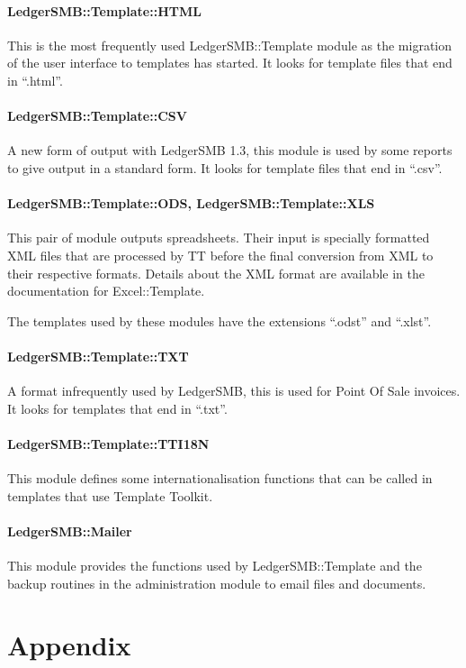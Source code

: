 \documentclass[english]{article}
\newcommand{\lsmb}{LedgerSMB }
\newcommand{\lsmbn}{LedgerSMB}
\newcommand{\lsmbt}{LedgerSMB::Template}
\begin{document}
\subsection{\lsmbt::HTML}
This is the most frequently used \lsmbt{ }module as the migration of the user
interface to templates has started.  It looks for template files that end in
``.html''.

\subsection{\lsmbt::CSV}
A new form of output with \lsmb 1.3, this module is used by some reports to
give output in a standard form.  It looks for template files that end in
``.csv''.

\subsection{\lsmbt::ODS, \lsmbt::XLS}
This pair of module outputs spreadsheets.  Their input is specially formatted
XML files that are processed by TT before the final conversion from XML to
their respective formats.  Details about the XML format are available in the
documentation for Excel::Template.

The templates used by these modules have the extensions ``.odst'' and
``.xlst''.

\subsection{\lsmbt::TXT}
A format infrequently used by \lsmbn, this is used for Point Of Sale invoices.
It looks for templates that end in ``.txt''.

\subsection{\lsmbt::TTI18N}
This module defines some internationalisation functions that can be called in
templates that use Template Toolkit.

\subsection{\lsmbn::Mailer}
This module provides the functions used by \lsmbt{ }and the backup routines
in the administration module to email files and documents.

\part{Appendix}
\appendix
\end{document}
